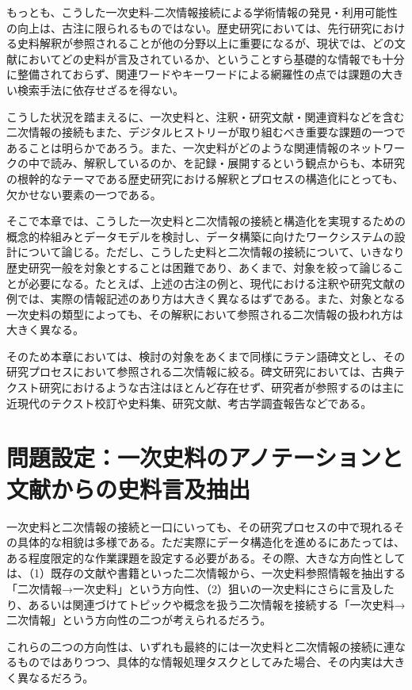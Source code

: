 もっとも、こうした一次史料-二次情報接続による学術情報の発見・利用可能性の向上は、古注に限られるものではない。歴史研究においては、先行研究における史料解釈が参照されることが他の分野以上に重要になるが、現状では、どの文献においてどの史料が言及されているか、ということすら基礎的な情報でも十分に整備されておらず、関連ワードやキーワードによる網羅性の点では課題の大きい検索手法に依存せざるを得ない。

こうした状況を踏まえるに、一次史料と、注釈・研究文献・関連資料などを含む二次情報の接続もまた、デジタルヒストリーが取り組むべき重要な課題の一つであることは明らかであろう。また、一次史料がどのような関連情報のネットワークの中で読み、解釈しているのか、を記録・展開するという観点からも、本研究の根幹的なテーマである歴史研究における解釈とプロセスの構造化にとっても、欠かせない要素の一つである。

そこで本章では、こうした一次史料と二次情報の接続と構造化を実現するための概念的枠組みとデータモデルを検討し、データ構築に向けたワークシステムの設計について論じる。ただし、こうした史料と二次情報の接続について、いきなり歴史研究一般を対象とすることは困難であり、あくまで、対象を絞って論じることが必要になる。たとえば、上述の古注の例と、現代における注釈や研究文献の例では、実際の情報記述のあり方は大きく異なるはずである。また、対象となる一次史料の類型によっても、その解釈において参照される二次情報の扱われ方は大きく異なる。

そのため本章においては、検討の対象をあくまで同様にラテン語碑文とし、その研究プロセスにおいて参照される二次情報に絞る。碑文研究においては、古典テクスト研究におけるような古注はほとんど存在せず、研究者が参照するのは主に近現代のテクスト校訂や史料集、研究文献、考古学調査報告などである。

\section{問題設定：一次史料のアノテーションと文献からの史料言及抽出}

一次史料と二次情報の接続と一口にいっても、その研究プロセスの中で現れるその具体的な相貌は多様である。ただ実際にデータ構造化を進めるにあたっては、ある程度限定的な作業課題を設定する必要がある。その際、大きな方向性としては、（1）既存の文献や書籍といった二次情報から、一次史料参照情報を抽出する「二次情報→一次史料」という方向性、（2）狙いの一次史料にさらに言及したり、あるいは関連づけてトピックや概念を扱う二次情報を接続する「一次史料→二次情報」という方向性の二つが考えられるだろう。

これらの二つの方向性は、いずれも最終的には一次史料と二次情報の接続に連なるものではありつつ、具体的な情報処理タスクとしてみた場合、その内実は大きく異なるだろう。


